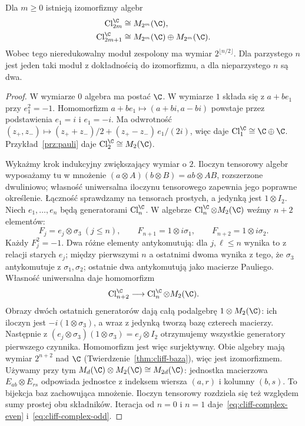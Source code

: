\begin{twierdzenie}
\label{thm:cliff-kompleks}
Dla $m\geq0$ istnieją izomorfizmy algebr
\begin{align}
 \operatorname{Cl}^{\C}_{2m}
   &\cong M_{2^m}(\C), \label{eq:cliff-complex-even}\\
 \operatorname{Cl}^{\C}_{2m+1}
   &\cong M_{2^m}(\C)\oplus M_{2^m}(\C).
   \label{eq:cliff-complex-odd}
\end{align}
Wobec tego nieredukowalny moduł zespolony
ma wymiar $2^{\lfloor n/2\rfloor}$.
Dla parzystego $n$ jest jeden taki moduł
z dokładnością do izomorfizmu, a dla
nieparzystego $n$ są dwa.
\end{twierdzenie}
\begin{proof}
W wymiarze $0$ algebra ma postać $\C$.
W wymiarze $1$ składa się z $a+be_1$ przy
$e_1^2=-1$. Homomorfizm
$a+be_1\mapsto(a+bi,a-bi)$ powstaje przez podstawienia
$e_1=i$ i $e_1=-i$.
Ma odwrotność
$(z_+,z_-)\mapsto(z_++z_-)/2+(z_+-z_-)\,e_1/(2i)$,
więc daje $\operatorname{Cl}^{\C}_1\cong\C\oplus\C$.
Przykład~\ref{prz:pauli} daje
$\operatorname{Cl}^{\C}_2\cong M_2(\C)$.

Wykażmy krok indukcyjny zwiększający wymiar o $2$.
Iloczyn tensorowy algebr wyposażamy tu w mnożenie
$(a\otimes A)(b\otimes B)=ab\otimes AB$, rozszerzone
dwuliniowo; własność uniwersalna iloczynu tensorowego zapewnia
jego poprawne określenie. Łączność sprawdzamy na tensorach
prostych, a jedynką jest $1\otimes I_2$.
Niech $e_1,\ldots,e_n$ będą generatorami
$\operatorname{Cl}^{\C}_n$. W algebrze
$\operatorname{Cl}^{\C}_n\otimes M_2(\C)$
weźmy $n+2$ elementów:
\[
 F_j=e_j\otimes\sigma_3\ (j\leq n),\qquad
 F_{n+1}=1\otimes i\sigma_1,\qquad
 F_{n+2}=1\otimes i\sigma_2.
\]
Każdy $F_j^2=-1$. Dwa różne elementy
antykomutują: dla $j,\ell\leq n$ wynika
to z relacji starych $e_j$; między pierwszymi
$n$ a ostatnimi dwoma wynika z tego, że
$\sigma_3$ antykomutuje z $\sigma_1,\sigma_2$;
ostatnie dwa antykomutują jako macierze Pauliego.
Własność uniwersalna daje homomorfizm
\[
 \operatorname{Cl}^{\C}_{n+2}
    \longrightarrow
   \operatorname{Cl}^{\C}_n\otimes M_2(\C).
\]
Obrazy dwóch ostatnich generatorów dają całą
podalgebrę $1\otimes M_2(\C)$:
ich iloczyn jest $-i(1\otimes\sigma_3)$,
a wraz z jedynką tworzą bazę czterech macierzy.
Następnie z
$(e_j\otimes\sigma_3)(1\otimes\sigma_3)
=e_j\otimes I_2$ otrzymujemy wszystkie
generatory pierwszego czynnika. Homomorfizm
jest więc surjektywny. Obie algebry mają
wymiar $2^{n+2}$ nad $\C$
(Twierdzenie~\ref{thm:cliff-baza}),
więc jest izomorfizmem. Używamy przy tym
$M_d(\C)\otimes M_2(\C)\cong M_{2d}(\C)$:
jednostka macierzowa $E_{ab}\otimes E_{rs}$ odpowiada
jednostce z indeksem wiersza $(a,r)$ i kolumny $(b,s)$.
To bijekcja baz zachowująca mnożenie. Iloczyn tensorowy
rozdziela się też względem sumy prostej obu składników.
Iteracja od $n=0$
i $n=1$ daje~\eqref{eq:cliff-complex-even}
i~\eqref{eq:cliff-complex-odd}.


\end{proof}
